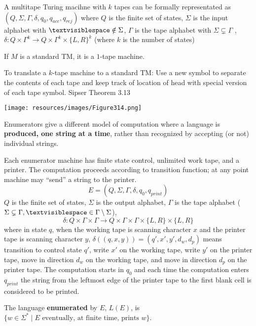 \documentclass[12pt, oneside]{article}
\begin{document}
\vfill 

 A multitape Turing macihne with $k$ tapes
can be formally representated as 
$(Q, \Sigma,  \Gamma, \delta, q_0, q_{acc}, q_{rej})$ 
where $Q$ is the finite set of  states,
$\Sigma$ is the  input alphabet with  $\textvisiblespace \notin \Sigma$,
$\Gamma$  is the  tape alphabet with $\Sigma \subsetneq \Gamma$ ,
$\delta: Q\times \Gamma^k\to Q \times \Gamma^k \times \{L,R\}^k$ 
(where $k$ is  the number of  states)


If $M$ is a standard  TM, it is a $1$-tape machine.


To translate a $k$-tape machine  to  a standard TM:
Use a  new symbol to separate the contents of each tape
and keep track of location of  head with  special version of each
tape symbol. {\tiny Sipser Theorem 3.13} 

\texttt{[image: resources/images/Figure314.png]}

\newpage
{} Enumerators give a different
model of computation where a language is {\bf produced, one string at a time},
rather than recognized by accepting (or not) individual strings.

Each enumerator machine has finite state control, unlimited work tape, and a printer. The computation proceeds
according to transition function; at any point machine may ``send'' a string to the printer.
\[
E  = (Q, \Sigma, \Gamma, \delta, q_0, q_{print})  
\]
$Q$ is the finite set of states, $\Sigma$ is  the output alphabet, $\Gamma$ is the 
tape alphabet ($\Sigma  \subsetneq\Gamma, 
\textvisiblespace \in \Gamma \setminus \Sigma$), 
\[
\delta:  Q  \times  \Gamma \times \Gamma \to  Q \times  \Gamma \times  \Gamma \times \{L, R\} \times  \{L, R\}
\]
where in state $q$, when the working tape is scanning character $x$ and the printer tape is scanning character $y$,
$\delta( (q,x,y) ) = (q', x', y', d_w, d_p)$ means transition to control state $q'$, write $x'$ on 
the working tape, write $y'$ on the printer tape, move in direction $d_w$ on the working tape, and move in direction 
$d_p$ on the printer tape. The computation starts in $q_0$ and each time the computation enters $q_{print}$
the string from the leftmost edge of the printer tape to the first blank cell is considered to be printed.

The language  {\bf  enumerated} by  $E$, $L(E)$, is $\{ w \in \Sigma^* \mid \text{$E$ eventually, at finite  time, 
prints $w$} \}$.
\end{document}
